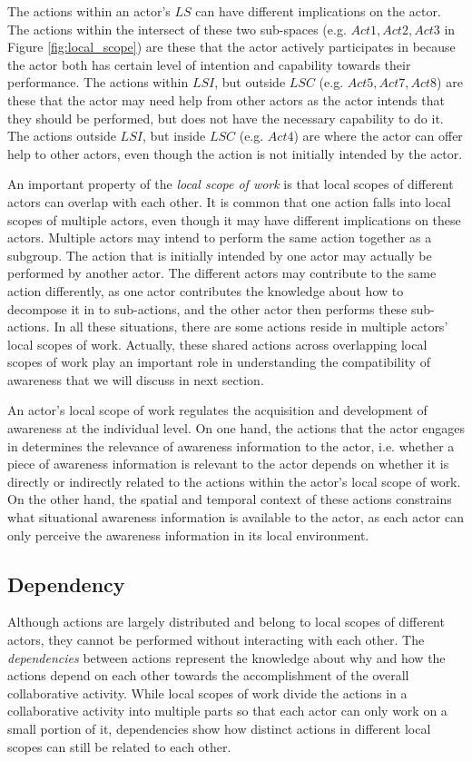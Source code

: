 The actions within an actor's $LS$ can have different implications on the actor. The actions within the intersect of these two sub-spaces (e.g. $Act1,Act2,Act3$ in Figure \ref{fig:local_scope}) are these that the actor actively participates in because the actor both has certain level of intention and capability towards their performance. The actions within $LSI$, but outside $LSC$ (e.g. $Act5,Act7,Act8$) are these that the actor may need help from other actors as the actor intends that they should be performed, but does not have the necessary capability to do it. The actions outside $LSI$, but inside $LSC$ (e.g. $Act4$) are where the actor can offer help to other actors, even though the action is not initially intended by the actor.

An important property of the \emph{local scope of work} is that local scopes of different actors can overlap with each other. It is common that one action falls into local scopes of multiple actors, even though it may have different implications on these actors. Multiple actors may intend to perform the same action together as a subgroup. The action that is initially intended by one actor may actually be performed by another actor. The different actors may contribute to the same action differently, as one actor contributes the knowledge about how to decompose it in to sub-actions, and the other actor then performs these sub-actions. In all these situations, there are some actions reside in multiple actors' local scopes of work. Actually, these shared actions across overlapping local scopes of work play an important role in understanding the compatibility of awareness that we will discuss in next section.

An actor's local scope of work regulates the acquisition and development of awareness at the individual level. On one hand, the actions that the actor engages in determines the relevance of awareness information to the actor, i.e. whether a piece of awareness information is relevant to the actor depends on whether it is directly or indirectly related to the actions within the actor's local scope of work. On the other hand, the spatial and temporal context of these actions constrains what situational awareness information is available to the actor, as each actor can only perceive the awareness information in its local environment.

\subsection{Dependency} %
\label{sub:dependency}
Although actions are largely distributed and belong to local scopes of different actors, they cannot be performed without interacting with each other. The \emph{dependencies} between actions represent the knowledge about why and how the actions depend on each other towards the accomplishment of the overall collaborative activity. While local scopes of work divide the actions in a collaborative activity into multiple parts so that each actor can only work on a small portion of it, dependencies show how distinct actions in different local scopes can still be related to each other.

